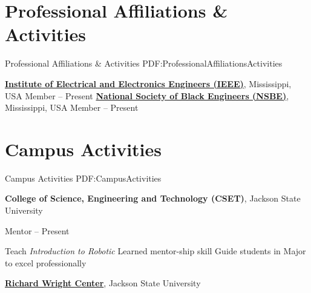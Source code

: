\documentclass[letterpaper,10pt,oneside]{article}
\begin{document}
\begin{body}




\section
{Professional Affiliations\newline
\& Activities}
{Professional Affiliations \& Activities}
{PDF:ProfessionalAffiliationsActivities}

\href{http://www.ieee.org/index.html}
{\textbf{Institute of Electrical and Electronics Engineers (IEEE)}},
Mississippi, USA
\GapNoBreak
\BulletItem
Member
\hfill
{} --
Present
\GapNoBreak
\href{https://www.nsbe.org/home.aspx}
{\textbf{National Society of Black Engineers (NSBE)}},
Mississippi, USA
\GapNoBreak
\BulletItem
Member
\hfill
{} --
Present


\section
{Campus Activities}
{Campus Activities}
{PDF:CampusActivities}

{\textbf{College of Science, Engineering and Technology (CSET)}},
Jackson State University

\GapNoBreak
\BulletItem
Mentor
\hfill
{} --
Present
\begin{detail}
\SubBulletItem
Teach \textit{Introduction to Robotic}
\SubBulletItem
Learned mentor-ship skill
\SubBulletItem
Guide students in Major to excel professionally 
\end{detail}


\href{http://www.jsums.edu/wrightcenter/}
{\textbf{Richard Wright Center}},
Jackson State University


\end{body}
\end{document}
